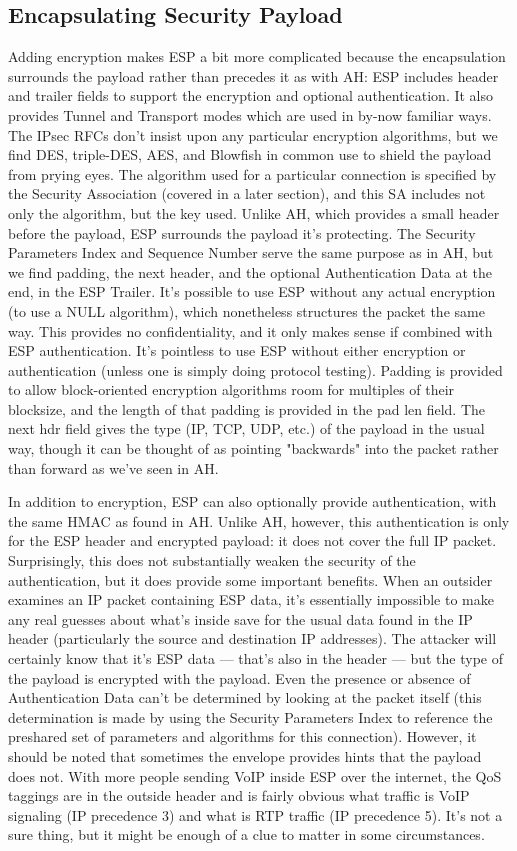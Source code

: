 \documentclass[12pt]{article}
\begin{document}
\subsection{Encapsulating Security Payload}
Adding encryption makes ESP a bit more complicated because the encapsulation surrounds the payload rather than precedes it as with AH: ESP includes header and trailer fields to support the encryption and optional authentication. It also provides Tunnel and Transport modes which are used in by-now familiar ways.
The IPsec RFCs don't insist upon any particular encryption algorithms, but we find DES, triple-DES, AES, and Blowfish in common use to shield the payload from prying eyes. The algorithm used for a particular connection is specified by the Security Association (covered in a later section), and this SA includes not only the algorithm, but the key used.
Unlike AH, which provides a small header before the payload, ESP surrounds the payload it's protecting. The Security Parameters Index and Sequence Number serve the same purpose as in AH, but we find padding, the next header, and the optional Authentication Data at the end, in the ESP Trailer.
It's possible to use ESP without any actual encryption (to use a NULL algorithm), which nonetheless structures the packet the same way. This provides no confidentiality, and it only makes sense if combined with ESP authentication. It's pointless to use ESP without either encryption or authentication (unless one is simply doing protocol testing).
Padding is provided to allow block-oriented encryption algorithms room for multiples of their blocksize, and the length of that padding is provided in the pad len field. The next hdr field gives the type (IP, TCP, UDP, etc.) of the payload in the usual way, though it can be thought of as pointing "backwards" into the packet rather than forward as we've seen in AH.

In addition to encryption, ESP can also optionally provide authentication, with the same HMAC as found in AH. Unlike AH, however, this authentication is only for the ESP header and encrypted payload: it does not cover the full IP packet. Surprisingly, this does not substantially weaken the security of the authentication, but it does provide some important benefits.
When an outsider examines an IP packet containing ESP data, it's essentially impossible to make any real guesses about what's inside save for the usual data found in the IP header (particularly the source and destination IP addresses). The attacker will certainly know that it's ESP data — that's also in the header — but the type of the payload is encrypted with the payload.
Even the presence or absence of Authentication Data can't be determined by looking at the packet itself (this determination is made by using the Security Parameters Index to reference the preshared set of parameters and algorithms for this connection).
However, it should be noted that sometimes the envelope provides hints that the payload does not. With more people sending VoIP inside ESP over the internet, the QoS taggings are in the outside header and is fairly obvious what traffic is VoIP signaling (IP precedence 3) and what is RTP traffic (IP precedence 5). It's not a sure thing, but it might be enough of a clue to matter in some circumstances.
\end{document}
